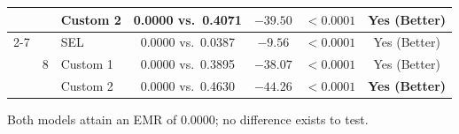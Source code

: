 \documentclass[runningheads]{llncs}
\begin{document}
\begin{table}[htbp]
{\begin{threeparttable}
\begin{tabular}{c|c|l|c|c|c|c}
 &                    & Custom 2 & 0.0000 vs.\ 0.4071 & $-39.50$& $<0.0001$ & Yes (Better) \\ \cline{2-7}
 & \multirow{3}{*}{8} & SEL      & 0.0000 vs.\ 0.0387 & $-9.56$ & $<0.0001$ & Yes (Better) \\
 &                    & Custom 1 & 0.0000 vs.\ 0.3895 & $-38.07$& $<0.0001$ & Yes (Better) \\
 &                    & Custom 2 & 0.0000 vs.\ 0.4630 & $-44.26$& $<0.0001$ & \textbf{Yes (Better)} \\
\bottomrule
\end{tabular}
\begin{tablenotes}
\small
\item[$\dagger$] Both models attain an EMR of $0.0000$; no difference exists to test.
\end{tablenotes}
\end{threeparttable}%
}
\end{table}
\end{document}
